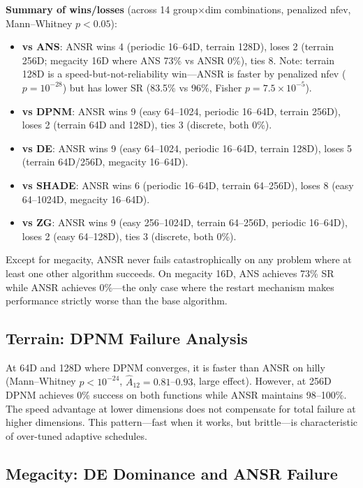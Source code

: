 \documentclass[11pt,a4paper]{article}
\begin{document}
\textbf{Summary of wins/losses} (across 14 group$\times$dim combinations, penalized nfev, Mann--Whitney $p < 0.05$):
\begin{itemize}
    \item \textbf{vs ANS}: ANSR wins 4 (periodic 16--64D, terrain 128D), loses 2 (terrain 256D; megacity 16D where ANS 73\% vs ANSR 0\%), ties 8. Note: terrain 128D is a speed-but-not-reliability win---ANSR is faster by penalized nfev ($p=10^{-28}$) but has lower SR (83.5\% vs 96\%, Fisher $p = 7.5\times10^{-5}$).
    \item \textbf{vs DPNM}: ANSR wins 9 (easy 64--1024, periodic 16--64D, terrain 256D), loses 2 (terrain 64D and 128D), ties 3 (discrete, both 0\%).
    \item \textbf{vs DE}: ANSR wins 9 (easy 64--1024, periodic 16--64D, terrain 128D), loses 5 (terrain 64D/256D, megacity 16--64D).
    \item \textbf{vs SHADE}: ANSR wins 6 (periodic 16--64D, terrain 64--256D), loses 8 (easy 64--1024D, megacity 16--64D).
    \item \textbf{vs ZG}: ANSR wins 9 (easy 256--1024D, terrain 64--256D, periodic 16--64D), loses 2 (easy 64--128D), ties 3 (discrete, both 0\%).
\end{itemize}

Except for megacity, ANSR never fails catastrophically on any problem where at least one other algorithm succeeds. On megacity 16D, ANS achieves 73\% SR while ANSR achieves 0\%---the only case where the restart mechanism makes performance strictly worse than the base algorithm.

\subsection{Terrain: DPNM Failure Analysis}

At 64D and 128D where DPNM converges, it is faster than ANSR on hilly (Mann--Whitney $p < 10^{-24}$, $\hat{A}_{12} = 0.81$--$0.93$, large effect). However, at 256D DPNM achieves 0\% success on both functions while ANSR maintains 98--100\%. The speed advantage at lower dimensions does not compensate for total failure at higher dimensions. This pattern---fast when it works, but brittle---is characteristic of over-tuned adaptive schedules.

\subsection{Megacity: DE Dominance and ANSR Failure}
\end{document}
